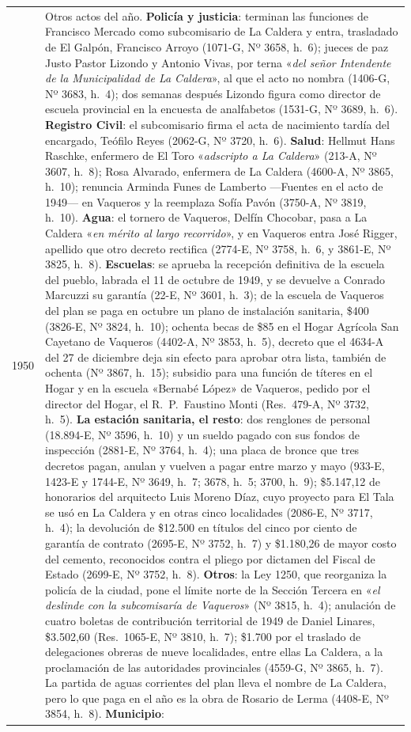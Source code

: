 \begin{longtable}{@{}p{2.7cm}p{10.3cm}@{}}
1950 & Otros actos del año. \textbf{Policía y justicia}: terminan las funciones de Francisco Mercado como subcomisario de La Caldera y entra, trasladado de El Galpón, Francisco Arroyo (1071-G, Nº 3658, h.\ 6); jueces de paz Justo Pastor Lizondo y Antonio Vivas, por terna «\textit{del señor Intendente de la Municipalidad de La Caldera}», al que el acto no nombra (1406-G, Nº 3683, h.\ 4); dos semanas después Lizondo figura como director de escuela provincial en la encuesta de analfabetos (1531-G, Nº 3689, h.\ 6). \textbf{Registro Civil}: el subcomisario firma el acta de nacimiento tardía del encargado, Teófilo Reyes (2062-G, Nº 3720, h.\ 6). \textbf{Salud}: Hellmut Hans Raschke, enfermero de El Toro «\textit{adscripto a La Caldera}» (213-A, Nº 3607, h.\ 8); Rosa Alvarado, enfermera de La Caldera (4600-A, Nº 3865, h.\ 10); renuncia Arminda Funes de Lamberto ---Fuentes en el acto de 1949--- en Vaqueros y la reemplaza Sofía Pavón (3750-A, Nº 3819, h.\ 10). \textbf{Agua}: el tornero de Vaqueros, Delfín Chocobar, pasa a La Caldera «\textit{en mérito al largo recorrido}», y en Vaqueros entra José Rigger, apellido que otro decreto rectifica (2774-E, Nº 3758, h.\ 6, y 3861-E, Nº 3825, h.\ 8). \textbf{Escuelas}: se aprueba la recepción definitiva de la escuela del pueblo, labrada el 11 de octubre de 1949, y se devuelve a Conrado Marcuzzi su garantía (22-E, Nº 3601, h.\ 3); de la escuela de Vaqueros del plan se paga en octubre un plano de instalación sanitaria, \$400 (3826-E, Nº 3824, h.\ 10); ochenta becas de \$85 en el Hogar Agrícola San Cayetano de Vaqueros (4402-A, Nº 3853, h.\ 5), decreto que el 4634-A del 27 de diciembre deja sin efecto para aprobar otra lista, también de ochenta (Nº 3867, h.\ 15); subsidio para una función de títeres en el Hogar y en la escuela «Bernabé López» de Vaqueros, pedido por el director del Hogar, el R.\ P.\ Faustino Monti (Res.\ 479-A, Nº 3732, h.\ 5). \textbf{La estación sanitaria, el resto}: dos renglones de personal (18.894-E, Nº 3596, h.\ 10) y un sueldo pagado con sus fondos de inspección (2881-E, Nº 3764, h.\ 4); una placa de bronce que tres decretos pagan, anulan y vuelven a pagar entre marzo y mayo (933-E, 1423-E y 1744-E, Nº 3649, h.\ 7; 3678, h.\ 5; 3700, h.\ 9); \$5.147,12 de honorarios del arquitecto Luis Moreno Díaz, cuyo proyecto para El Tala se usó en La Caldera y en otras cinco localidades (2086-E, Nº 3717, h.\ 4); la devolución de \$12.500 en títulos del cinco por ciento de garantía de contrato (2695-E, Nº 3752, h.\ 7) y \$1.180,26 de mayor costo del cemento, reconocidos contra el pliego por dictamen del Fiscal de Estado (2699-E, Nº 3752, h.\ 8). \textbf{Otros}: la Ley 1250, que reorganiza la policía de la ciudad, pone el límite norte de la Sección Tercera en «\textit{el deslinde con la subcomisaría de Vaqueros}» (Nº 3815, h.\ 4); anulación de cuatro boletas de contribución territorial de 1949 de Daniel Linares, \$3.502,60 (Res.\ 1065-E, Nº 3810, h.\ 7); \$1.700 por el traslado de delegaciones obreras de nueve localidades, entre ellas La Caldera, a la proclamación de las autoridades provinciales (4559-G, Nº 3865, h.\ 7). La partida de aguas corrientes del plan lleva el nombre de La Caldera, pero lo que paga en el año es la obra de Rosario de Lerma (4408-E, Nº 3854, h.\ 8). \textbf{Municipio}: 
\end{longtable}
